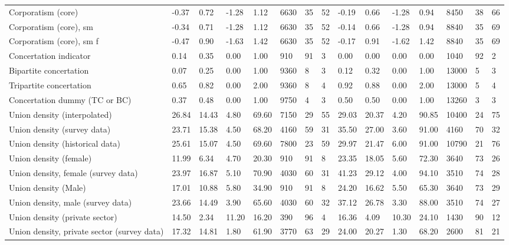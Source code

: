 \begin{longtable}{lllllllllllllll}
Corporatism (core) & -0.37 & 0.72 & -1.28 & 1.12 & 6630 & 35 & 52 & -0.19 & 0.66 & -1.28 & 0.94 & 8450 & 38 & 66\\
\addlinespace
Corporatism (core), sm & -0.34 & 0.71 & -1.28 & 1.12 & 6630 & 35 & 52 & -0.14 & 0.66 & -1.28 & 0.94 & 8840 & 35 & 69\\
Corporatism (core), sm f & -0.47 & 0.90 & -1.63 & 1.42 & 6630 & 35 & 52 & -0.17 & 0.91 & -1.62 & 1.42 & 8840 & 35 & 69\\
Concertation indicator & 0.14 & 0.35 & 0.00 & 1.00 & 910 & 91 & 3 & 0.00 & 0.00 & 0.00 & 0.00 & 1040 & 92 & 2\\
Bipartite concertation & 0.07 & 0.25 & 0.00 & 1.00 & 9360 & 8 & 3 & 0.12 & 0.32 & 0.00 & 1.00 & 13000 & 5 & 3\\
Tripartite concertation & 0.65 & 0.82 & 0.00 & 2.00 & 9360 & 8 & 4 & 0.92 & 0.88 & 0.00 & 2.00 & 13000 & 5 & 4\\
\addlinespace
Concertation dummy (TC or BC) & 0.37 & 0.48 & 0.00 & 1.00 & 9750 & 4 & 3 & 0.50 & 0.50 & 0.00 & 1.00 & 13260 & 3 & 3\\
Union density (interpolated) & 26.84 & 14.43 & 4.80 & 69.60 & 7150 & 29 & 55 & 29.03 & 20.37 & 4.20 & 90.85 & 10400 & 24 & 75\\
Union density (survey data) & 23.71 & 15.38 & 4.50 & 68.20 & 4160 & 59 & 31 & 35.50 & 27.00 & 3.60 & 91.00 & 4160 & 70 & 32\\
Union density (historical data) & 25.61 & 15.07 & 4.50 & 69.60 & 7800 & 23 & 59 & 29.97 & 21.47 & 6.00 & 91.00 & 10790 & 21 & 76\\
Union density (female) & 11.99 & 6.34 & 4.70 & 20.30 & 910 & 91 & 8 & 23.35 & 18.05 & 5.60 & 72.30 & 3640 & 73 & 26\\
\addlinespace
Union density, female (survey data) & 23.97 & 16.87 & 5.10 & 70.90 & 4030 & 60 & 31 & 41.23 & 29.12 & 4.00 & 94.10 & 3510 & 74 & 28\\
Union density (Male) & 17.01 & 10.88 & 5.80 & 34.90 & 910 & 91 & 8 & 24.20 & 16.62 & 5.50 & 65.30 & 3640 & 73 & 29\\
Union density, male (survey data) & 23.66 & 14.49 & 3.90 & 65.60 & 4030 & 60 & 32 & 37.12 & 26.78 & 3.30 & 88.00 & 3510 & 74 & 27\\
Union density (private sector) & 14.50 & 2.34 & 11.20 & 16.20 & 390 & 96 & 4 & 16.36 & 4.09 & 10.30 & 24.10 & 1430 & 90 & 12\\
Union density, private sector (survey data) & 17.32 & 14.81 & 1.80 & 61.90 & 3770 & 63 & 29 & 24.00 & 20.27 & 1.30 & 68.20 & 2600 & 81 & 21\\

\end{longtable}
